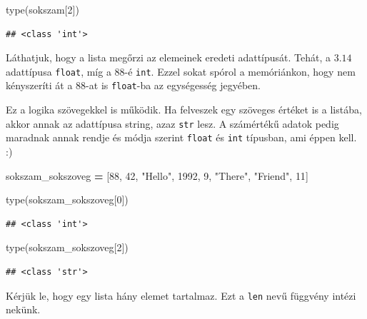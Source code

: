 \documentclass[
]{book}
\newenvironment{Shaded}{\begin{snugshade}}{\end{snugshade}}
\newcommand{\BuiltInTok}[1]{#1}
\newcommand{\DecValTok}[1]{\textcolor[rgb]{0.00,0.00,0.81}{#1}}
\newcommand{\NormalTok}[1]{#1}
\newcommand{\OperatorTok}[1]{\textcolor[rgb]{0.81,0.36,0.00}{\textbf{#1}}}
\newcommand{\StringTok}[1]{\textcolor[rgb]{0.31,0.60,0.02}{#1}}
\begin{document}
\begin{Shaded}
\begin{Highlighting}[]
\BuiltInTok{type}\NormalTok{(sokszam[}\DecValTok{2}\NormalTok{])}
\end{Highlighting}
\end{Shaded}

\begin{verbatim}
## <class 'int'>
\end{verbatim}

Láthatjuk, hogy a lista megőrzi az elemeinek eredeti adattípusát. Tehát, a \(3.14\) adattípusa \texttt{float}, míg a \(88\)-é \texttt{int}. Ezzel sokat spórol a memóriánkon, hogy nem kényszeríti át a \(88\)-at is \texttt{float}-ba az egységesség jegyében.

Ez a logika szövegekkel is működik. Ha felveszek egy szöveges értéket is a listába, akkor annak az adattípusa string, azaz \texttt{str} lesz. A számértékű adatok pedig maradnak annak rendje és módja szerint \texttt{float} és \texttt{int} típusban, ami éppen kell. :)

\begin{Shaded}
\begin{Highlighting}[]
\NormalTok{sokszam\_sokszoveg }\OperatorTok{=}\NormalTok{ [}\DecValTok{88}\NormalTok{, }\DecValTok{42}\NormalTok{, }\StringTok{"Hello"}\NormalTok{, }\DecValTok{1992}\NormalTok{, }\DecValTok{9}\NormalTok{, }\StringTok{"There"}\NormalTok{, }\StringTok{"Friend"}\NormalTok{, }\DecValTok{11}\NormalTok{]}

\BuiltInTok{type}\NormalTok{(sokszam\_sokszoveg[}\DecValTok{0}\NormalTok{])}
\end{Highlighting}
\end{Shaded}

\begin{verbatim}
## <class 'int'>
\end{verbatim}

\begin{Shaded}
\begin{Highlighting}[]
\BuiltInTok{type}\NormalTok{(sokszam\_sokszoveg[}\DecValTok{2}\NormalTok{])}
\end{Highlighting}
\end{Shaded}

\begin{verbatim}
## <class 'str'>
\end{verbatim}

Kérjük le, hogy egy lista hány elemet tartalmaz. Ezt a \texttt{len} nevű függvény intézi nekünk.
\end{document}
